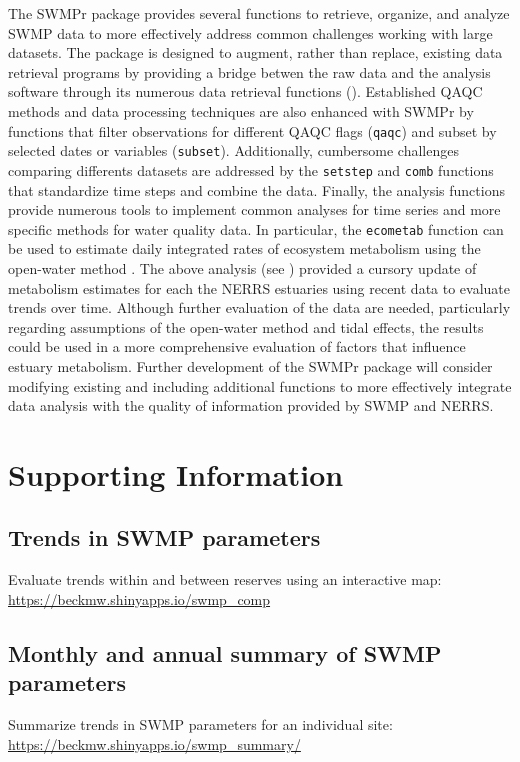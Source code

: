 \documentclass[10pt,letterpaper]{article}\usepackage[]{graphicx}\usepackage[]{color}
\begin{document}
The SWMPr package provides several functions to retrieve, organize, and analyze \ac{SWMP} data to more effectively address common challenges working with large datasets.  The package is designed to augment, rather than replace, existing data retrieval programs by providing a bridge betwen the raw data and the analysis software through its numerous data retrieval functions ().  Established \ac{QAQC} methods and data processing techniques are also enhanced with SWMPr by functions that filter observations for different \ac{QAQC} flags (\texttt{qaqc}) and subset by selected dates or variables (\texttt{subset}).  Additionally, cumbersome challenges comparing differents datasets are addressed by the \texttt{setstep} and \texttt{comb} functions that standardize time steps and combine the data.  Finally, the analysis functions provide numerous tools to implement common analyses for time series and more specific methods for water quality data.  In particular, the \texttt{ecometab} function can be used to estimate daily integrated rates of ecosystem metabolism using the open-water method \cite{Odum56,Caffrey14}.  The above analysis (see ) provided a cursory update of metabolism estimates for each the \ac{NERRS} estuaries using recent data to evaluate trends over time.  Although further evaluation of the data are needed, particularly regarding assumptions of the open-water method and tidal effects, the results could be used in a more comprehensive evaluation of factors that influence estuary metabolism. Further development of the SWMPr package will consider modifying existing and including additional functions to more effectively integrate data analysis with the quality of information provided by \ac{SWMP} and \ac{NERRS}. 

\section*{Supporting Information}
\label{supp_info}

\subsection*{Trends in \ac{SWMP} parameters}
\label{swmp_trends}
Evaluate trends within and between reserves using an interactive map: \href{https://beckmw.shinyapps.io/swmp_comp}{https://beckmw.shinyapps.io/swmp\_comp}

\subsection*{Monthly and annual summary of \ac{SWMP} parameters}
\label{swmp_summary}
Summarize trends in \ac{SWMP} parameters for an individual site: \href{https://beckmw.shinyapps.io/swmp_summary/}{https://beckmw.shinyapps.io/swmp\_summary/} 
\end{document}

